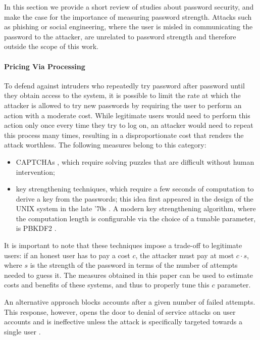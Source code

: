 \documentclass[a4paper,twocolumn]{article}
\begin{document}
\label{sec:Related-Work}In this section we provide a short review
of studies about password security, and make the case for the importance
of measuring password strength. Attacks such as phishing or social
engineering, where the user is misled in communicating the password
to the attacker, are unrelated to password strength and therefore
outside the scope of this work.


\paragraph{Pricing Via Processing}

To defend against intruders who repeatedly try password after password
until they obtain access to the system, it is possible to limit the
rate at which the attacker is allowed to try new passwords by requiring
the user to perform an action with a moderate cost. While legitimate
users would need to perform this action only once every time they
try to log on, an attacker would need to repeat this process many
times, resulting in a disproportionate cost that renders the attack
worthless. The following measures belong to this category:
\begin{itemize}
\item CAPTCHAs \cite{VonAhn2004Telling}, which require solving puzzles
that are difficult without human intervention;
\item key strengthening techniques, which require a few seconds of computation
to derive a key from the passwords; this idea first appeared in the
design of the UNIX system in the late '70s \cite{Morris1979Password}.
A modern key strengthening algorithm, where the computation length
is configurable via the choice of a tunable parameter, is PBKDF2 \cite{Kaliski2000RFC}.
\end{itemize}
It is important to note that these techniques impose a trade-off to
legitimate users: if an honest user has to pay a cost $c$, the attacker
must pay at most $c\cdot s$, where $s$ is the strength of the password
in terms of the number of attempts needed to guess it. The measures
obtained in this paper can be used to estimate costs and benefits
of these systems, and thus to properly tune this $c$ parameter.

An alternative approach blocks accounts after a given number of failed
attempts. This response, however, opens the door to denial of service
attacks on user accounts and is ineffective unless the attack is specifically
targeted towards a single user \cite{Pinkas2002Securing}.
\end{document}
